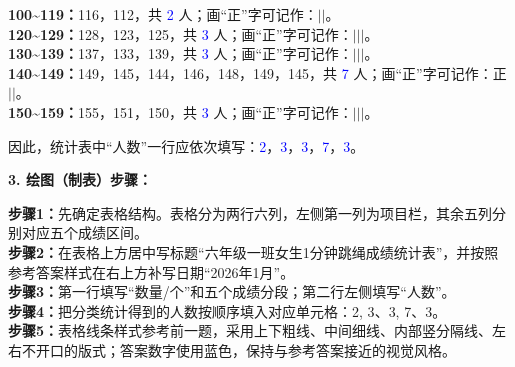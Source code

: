 \noindent
\textbf{100\textasciitilde119：}116，112，共 \textcolor{blue}{2} 人；\quad 画“正”字可记作：$\vert\vert$。\\
\textbf{120\textasciitilde129：}128，123，125，共 \textcolor{blue}{3} 人；\quad 画“正”字可记作：$\vert\vert\vert$。\\
\textbf{130\textasciitilde139：}137，133，139，共 \textcolor{blue}{3} 人；\quad 画“正”字可记作：$\vert\vert\vert$。\\
\textbf{140\textasciitilde149：}149，145，144，146，148，149，145，共 \textcolor{blue}{7} 人；\quad 画“正”字可记作：正$\vert\vert$。\\
\textbf{150\textasciitilde159：}155，151，150，共 \textcolor{blue}{3} 人；\quad 画“正”字可记作：$\vert\vert\vert$。

\vspace{0.4cm}

\noindent
因此，统计表中“人数”一行应依次填写：\textcolor{blue}{2}，\textcolor{blue}{3}，\textcolor{blue}{3}，\textcolor{blue}{7}，\textcolor{blue}{3}。

\vspace{0.7cm}

\noindent\textbf{3. 绘图（制表）步骤：}

\vspace{0.2cm}

{\small\color{gray}
\textbf{步骤1：}先确定表格结构。表格分为两行六列，左侧第一列为项目栏，其余五列分别对应五个成绩区间。\\
\textbf{步骤2：}在表格上方居中写标题“六年级一班女生1分钟跳绳成绩统计表”，并按照参考答案样式在右上方补写日期“2026年1月”。\\
\textbf{步骤3：}第一行填写“数量/个”和五个成绩分段；第二行左侧填写“人数”。\\
\textbf{步骤4：}把分类统计得到的人数按顺序填入对应单元格：2, 3$、$3, 7$、$3。\\
\textbf{步骤5：}表格线条样式参考前一题，采用上下粗线、中间细线、内部竖分隔线、左右不开口的版式；答案数字使用蓝色，保持与参考答案接近的视觉风格。
}

\vspace{0.8cm}



